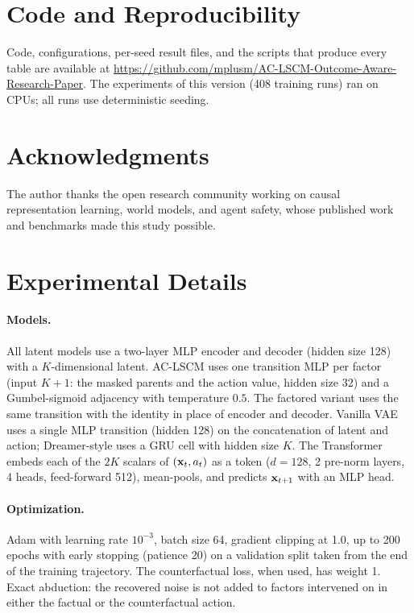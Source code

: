 \section*{Code and Reproducibility}
Code, configurations, per-seed result files, and the scripts that produce
every table are available at
\url{https://github.com/mplusm/AC-LSCM-Outcome-Aware-Research-Paper}.
The experiments of this version (408 training runs) ran on CPUs; all runs use
deterministic seeding.

\section*{Acknowledgments}
The author thanks the open research community working on causal
representation learning, world models, and agent safety, whose published
work and benchmarks made this study possible.



\appendix

\section{Experimental Details}
\label{app:details}

\paragraph{Models.}
All latent models use a two-layer MLP encoder and decoder (hidden size 128)
with a $K$-dimensional latent. AC-LSCM uses one transition MLP per factor
(input $K{+}1$: the masked parents and the action value, hidden size 32) and a
Gumbel-sigmoid adjacency with temperature $0.5$. The factored variant uses
the same transition with the identity in place of encoder and decoder.
Vanilla VAE uses a single MLP transition (hidden 128) on the concatenation of
latent and action; Dreamer-style uses a GRU cell with hidden size $K$. The
Transformer embeds each of the $2K$ scalars of $(\mathbf{x}_t, a_t)$ as a token
($d = 128$, 2 pre-norm layers, 4 heads, feed-forward 512), mean-pools, and
predicts $\mathbf{x}_{t+1}$ with an MLP head.

\paragraph{Optimization.}
Adam with learning rate $10^{-3}$, batch size 64, gradient clipping at 1.0,
up to 200 epochs with early stopping (patience 20) on a validation split
taken from the end of the training trajectory. The counterfactual loss, when
used, has weight 1. Exact abduction: the recovered noise is not added to
factors intervened on in either the factual or the counterfactual action.

